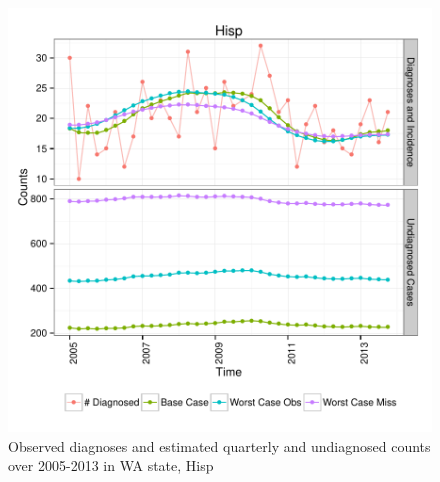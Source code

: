 \documentclass{article}\usepackage[]{graphicx}\usepackage[]{color}
\makeatletter
\def\maxwidth{ %
  \ifdim\Gin@nat@width>\linewidth
    \linewidth
  \else
    \Gin@nat@width
  \fi
}
\newenvironment{knitrout}{}{} %
\makeatother
\begin{document}
\begin{knitrout}\footnotesize
{}\color{fgcolor}\begin{figure}[]


{\centering \includegraphics[width=\maxwidth]{figure/minimal-plot_subgroup_Hisp} 

}

\caption[Observed diagnoses and estimated quarterly and undiagnosed counts over 2005-2013 in WA state, Hisp]{Observed diagnoses and estimated quarterly and undiagnosed counts over 2005-2013 in WA state, Hisp\label{fig:plot_subgroup_Hisp}}
\end{figure}


\end{knitrout}
\end{document}
